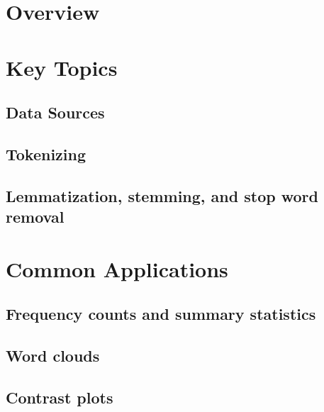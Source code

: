 \documentclass[
]{book}
\begin{document}
\hypertarget{overview-1}{%
\section{Overview}\label{overview-1}}

\hypertarget{key-topics-1}{%
\section{Key Topics}\label{key-topics-1}}

\hypertarget{data-sources}{%
\subsection{Data Sources}\label{data-sources}}

\hypertarget{tokenizing}{%
\subsection{Tokenizing}\label{tokenizing}}

\hypertarget{lemmatization-stemming-and-stop-word-removal}{%
\subsection{Lemmatization, stemming, and stop word removal}\label{lemmatization-stemming-and-stop-word-removal}}

\hypertarget{common-applications-1}{%
\section{Common Applications}\label{common-applications-1}}

\hypertarget{frequency-counts-and-summary-statistics}{%
\subsection{Frequency counts and summary statistics}\label{frequency-counts-and-summary-statistics}}

\hypertarget{word-clouds}{%
\subsection{Word clouds}\label{word-clouds}}

\hypertarget{contrast-plots}{%
\subsection{Contrast plots}\label{contrast-plots}}
\end{document}
